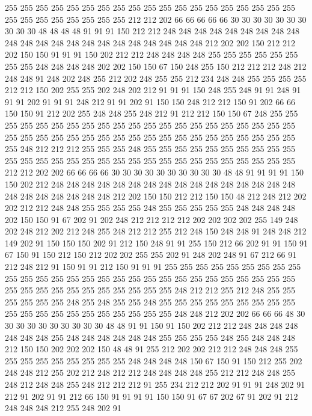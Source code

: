 255 255 255 255 255 255 255 255 255 255 255 255 255 255 255 255 255 255 255 255
255 255 255 255 255 255 255 212 212 202 66 66 66 66 66 30 30 30 30 30
30 30 30 30 30 48 48 48 48 91 91 91 150 212 212 248 248 248 248 248
248 248 248 248 248 248 248 248 248 248 248 248 248 248 248 248 248 212 202 202
150 212 212 202 150 150 91 91 91 150 202 212 212 248 248 248 248 255 255 255
255 255 255 255 255 248 248 248 248 202 202 150 150 67 150 248 255 150 212 212
212 248 212 248 248 91 248 202 248 255 212 202 248 255 255 212 234 248 248 255
255 255 255 212 212 150 202 255 255 202 248 202 212 91 91 91 150 248 255 248
91 91 248 91 91 91 202 91 91 91 248 212 91 91 202 91 150 150 248 212
212 150 91 202 66 66 150 150 91 212 202 255 248 248 255 248 212 91 212 212
150 150 67 248 255 255 255 255 255 255 255 255 255 255 255 255 255 255 255 255
255 255 255 255 255 255 255 255 255 255 255 255 255 255 255 255 255 255 255 255
255 255 255 255 255 248 212 212 212 255 255 255 248 255 255 255 255 255 255 255
255 255 255 255 255 255 255 255 255 255 255 255 255 255 255 255 255 255 255 255
255 255 212 212 202 202 66 66 66 66 30 30 30 30 30 30 30 30 30 30
48 48 91 91 91 91 150 150 202 212 248 248 248 248 248 248 248 248 248 248
248 248 248 248 248 248 248 248 248 248 248 248 248 212 202 150 150 212 212 150
150 48 212 248 212 202 202 212 212 248 248 255 255 255 255 248 255 255 255 255
255 248 248 248 248 202 150 150 91 67 202 91 202 248 212 212 212 212 202 202
202 202 255 149 248 202 248 212 202 212 248 255 248 212 212 255 212 248 150 248
248 91 248 248 212 149 202 91 150 150 150 202 91 212 150 248 91 91 255 150
212 66 202 91 91 150 91 67 150 91 150 212 150 212 202 202 255 255 202 91
248 202 248 91 67 212 66 91 212 248 212 91 150 91 91 212 150 91 91 91
255 255 255 255 255 255 255 255 255 255 255 255 255 255 255 255 255 255 255 255
255 255 255 255 255 255 255 255 255 255 255 255 255 255 255 255 255 255 255 248
212 212 255 212 248 255 255 255 255 255 255 248 255 248 255 255 248 255 255 255
255 255 255 255 255 255 255 255 255 255 255 255 255 255 255 255 255 248 248 212
202 202 66 66 66 48 30 30 30 30 30 30 30 30 30 30 48 48 91 91
150 91 150 202 212 212 248 248 248 248 248 248 248 255 248 248 248 248 248 248
255 255 255 255 248 255 248 248 248 212 150 150 202 202 202 150 48 48 91 255
212 202 202 212 212 248 248 248 255 255 255 255 255 255 255 255 255 248 248 248
248 150 67 150 91 150 212 255 202 248 248 212 255 202 212 248 212 212 248 248
248 248 255 212 212 248 248 255 248 212 248 248 255 248 212 212 212 91 255 234
212 212 202 91 91 91 248 202 91 212 91 202 91 91 212 66 150 91 91 91
91 150 150 91 67 67 202 67 91 202 91 212 248 248 248 212 255 248 202 91
